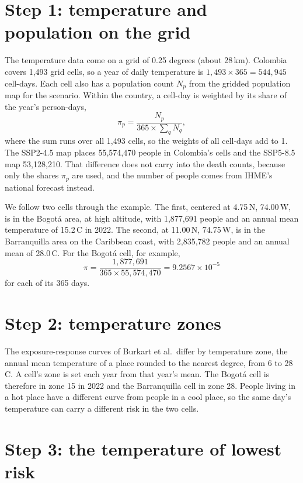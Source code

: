 \documentclass[11pt]{ozreport}
\begin{document}
\section{Step 1: temperature and population on the grid}

The temperature data come on a grid of 0.25 degrees (about 28\,km). Colombia covers 1,493 grid cells, so a year of daily temperature is $1{,}493 \times 365 = 544{,}945$ cell-days. Each cell also has a population count $N_p$ from the gridded population map for the scenario. Within the country, a cell-day is weighted by its share of the year's person-days,
\begin{equation}
  \pi_{p} = \frac{N_p}{365 \times \sum_{q} N_q},
\end{equation}
where the sum runs over all 1,493 cells, so the weights of all cell-days add to 1. The SSP2-4.5 map places 55,574,470 people in Colombia's cells and the SSP5-8.5 map 53,128,210. That difference does not carry into the death counts, because only the shares $\pi_p$ are used, and the number of people comes from IHME's national forecast instead.

We follow two cells through the example. The first, centered at 4.75\textdegree\,N, 74.00\textdegree\,W, is in the Bogotá area, at high altitude, with 1,877,691 people and an annual mean temperature of 15.2\,\textdegree C in 2022. The second, at 11.00\textdegree\,N, 74.75\textdegree\,W, is in the Barranquilla area on the Caribbean coast, with 2,835,782 people and an annual mean of 28.0\,\textdegree C. For the Bogotá cell, for example,
\[
  \pi = \frac{1{,}877{,}691}{365 \times 55{,}574{,}470} = 9.2567 \times 10^{-5}
\]
for each of its 365 days.

\section{Step 2: temperature zones}

The exposure-response curves of Burkart et al.\ differ by temperature zone, the annual mean temperature of a place rounded to the nearest degree, from 6 to 28\,\textdegree C. A cell's zone is set each year from that year's mean. The Bogotá cell is therefore in zone 15 in 2022 and the Barranquilla cell in zone 28. People living in a hot place have a different curve from people in a cool place, so the same day's temperature can carry a different risk in the two cells.

\section{Step 3: the temperature of lowest risk}
\end{document}
